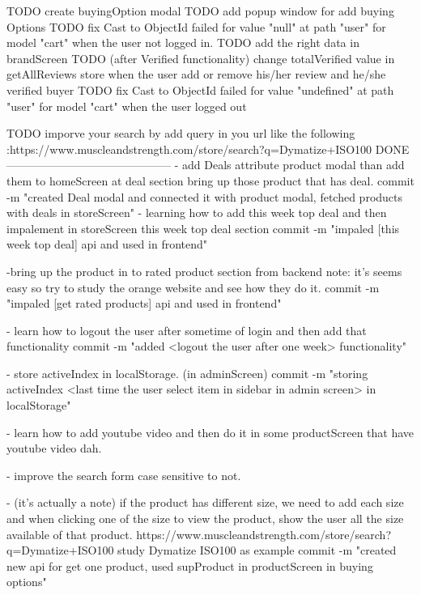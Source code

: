 TODO   create buyingOption modal 
TODO   add popup window for add buying Options
TODO   fix Cast to ObjectId failed for value "null" at path "user" for model "cart" when the user not logged in.
TODO   add the right data in brandScreen 
TODO   (after Verified functionality) change totalVerified value in getAllReviews store when the user add or remove his/her review and he/she verified buyer
TODO fix Cast to ObjectId failed for value "undefined" at path 
      "user" for model "cart" when the user logged out

TODO imporve your search by add query in you url like the following :https://www.muscleandstrength.com/store/search?q=Dymatize+ISO100
DONE
--------------------------------------------
- add Deals attribute product modal than add them to homeScreen 
       at deal section bring up those product that has deal.
       commit -m "created Deal modal and connected it with product modal, fetched products with deals in 
       storeScreen"
- learning how to add this week top deal and then impalement in storeScreen this week top deal section
      commit -m "impaled [this week top deal] api and used in frontend"

-bring up the product in to rated product section from backend 
      note: it's seems easy so try to study the orange website and see how they do it.
      commit -m "impaled [get rated products] api and used in frontend"

-   learn how to logout the user after sometime of login and 
            then add that functionality
      commit -m "added <logout the user after one week> functionality"

- store activeIndex in localStorage. (in adminScreen)
      commit -m "storing activeIndex <last time the user select item in sidebar in admin screen> in localStorage"

- learn how to add youtube video and then do it in some 
      productScreen that have youtube video dah.

- improve the search form case sensitive to not.

-  (it's actually a note) if the product has different size, 
      we need to add each size and when
      clicking one of the size to view the product, show the 
      user all the size available of that product.
      https://www.muscleandstrength.com/store/search?q=Dymatize+ISO100
      study Dymatize ISO100 as example
      commit -m "created new api for get one product, used supProduct in productScreen in buying options"


